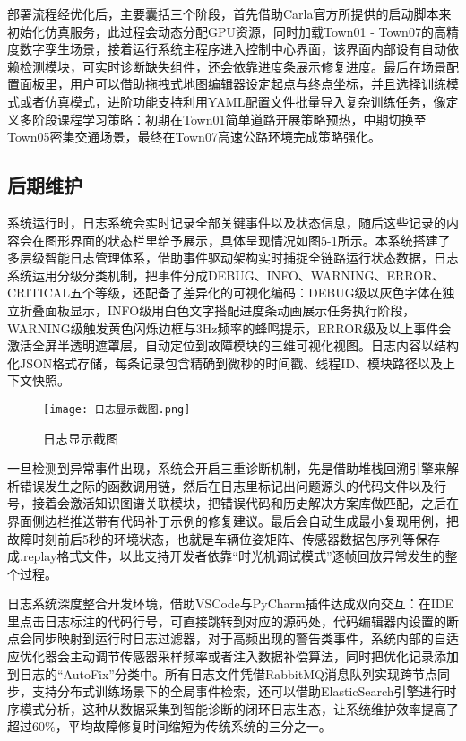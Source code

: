 部署流程经优化后，主要囊括三个阶段，首先借助Carla官方所提供的启动脚本来初始化仿真服务，此过程会动态分配GPU资源，同时加载Town01 - Town07的高精度数字孪生场景，接着运行系统主程序进入控制中心界面，该界面内部设有自动依赖检测模块，可实时诊断缺失组件，还会依靠进度条展示修复进度。最后在场景配置面板里，用户可以借助拖拽式地图编辑器设定起点与终点坐标，并且选择训练模式或者仿真模式，进阶功能支持利用YAML配置文件批量导入复杂训练任务，像定义多阶段课程学习策略：初期在Town01简单道路开展策略预热，中期切换至Town05密集交通场景，最终在Town07高速公路环境完成策略强化。
\subsection{后期维护}

系统运行时，日志系统会实时记录全部关键事件以及状态信息，随后这些记录的内容会在图形界面的状态栏里给予展示，具体呈现情况如图5-1所示。本系统搭建了多层级智能日志管理体系，借助事件驱动架构实时捕捉全链路运行状态数据，日志系统运用分级分类机制，把事件分成DEBUG、INFO、WARNING、ERROR、CRITICAL五个等级，还配备了差异化的可视化编码：DEBUG级以灰色字体在独立折叠面板显示，INFO级用白色文字搭配进度条动画展示任务执行阶段，WARNING级触发黄色闪烁边框与3Hz频率的蜂鸣提示，ERROR级及以上事件会激活全屏半透明遮罩层，自动定位到故障模块的三维可视化视图。日志内容以结构化JSON格式存储，每条记录包含精确到微秒的时间戳、线程ID、模块路径以及上下文快照。

\begin{figure}[hbt]
	\centering
	\texttt{[image: 日志显示截图.png]}
	\caption{日志显示截图}
	\label{f.example}
\end{figure}

一旦检测到异常事件出现，系统会开启三重诊断机制，先是借助堆栈回溯引擎来解析错误发生之际的函数调用链，然后在日志里标记出问题源头的代码文件以及行号，接着会激活知识图谱关联模块，把错误代码和历史解决方案库做匹配，之后在界面侧边栏推送带有代码补丁示例的修复建议。最后会自动生成最小复现用例，把故障时刻前后5秒的环境状态，也就是车辆位姿矩阵、传感器数据包序列等保存成.replay格式文件，以此支持开发者依靠“时光机调试模式”逐帧回放异常发生的整个过程。

日志系统深度整合开发环境，借助VSCode与PyCharm插件达成双向交互：在IDE里点击日志标注的代码行号，可直接跳转到对应的源码处，代码编辑器内设置的断点会同步映射到运行时日志过滤器，对于高频出现的警告类事件，系统内部的自适应优化器会主动调节传感器采样频率或者注入数据补偿算法，同时把优化记录添加到日志的“AutoFix”分类中。所有日志文件凭借RabbitMQ消息队列实现跨节点同步，支持分布式训练场景下的全局事件检索，还可以借助ElasticSearch引擎进行时序模式分析，这种从数据采集到智能诊断的闭环日志生态，让系统维护效率提高了超过60\%，平均故障修复时间缩短为传统系统的三分之一。